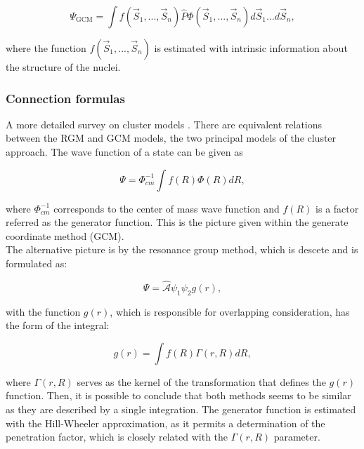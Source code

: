 \documentclass[openany]{book}
\begin{document}
\begin{equation}\label{eq:micro_cluster_GCM_waveFunction}
	\Psi_{\mathrm{GCM}} = \int f(\vec S_1, ..., \vec S_n) \hat P \Phi(\vec S_1, ..., \vec S_n) d\vec S_1 ... d\vec S_n,
\end{equation}

where the function $ f(\vec S_1, ..., \vec S_n) $ is estimated with intrinsic information about the structure of the nuclei. \\

\subsubsection{Connection formulas} \label{ssub:connectionFormulas}

A more detailed survey on cluster models \cite{beck_2012}. There are equivalent relations between the RGM and GCM models, the two principal models of the cluster approach. The wave function of a state can be given as

\begin{equation}\label{eq:micro_cluster_equivalency_RGM}
	\Psi = \Phi^{-1}_{cm} \int f(R) \Phi(R) dR,
\end{equation}

where $\Phi^{-1}_{cm}$ corresponds to the center of mass wave function and $f(R)$ is a factor referred as the generator function. This is the picture given within the generate coordinate method (GCM). \\

The alternative picture is by the resonance group method, which is descete and is formulated as:

\begin{equation}\label{eq:micro_cluster_equivalency_GCM}
	\Psi = \hat{\mathcal{A}} \psi_1 \psi_2 g(r), 
\end{equation}

with the function $g(r)$, which is responsible for overlapping consideration, has the form of the integral: 

\begin{equation}\label{eq:micro_cluster_equivalency_GCM_g}
	g(r) = \int f(R) \Gamma(r, R) dR,
\end{equation}

where $\Gamma(r, R)$ serves as the kernel of the transformation that defines the $g(r)$ function. Then, it is possible to conclude that both methods seems to be similar as they are described by a single integration. The generator function is estimated with the Hill-Wheeler approximation, as it permits a determination of the penetration factor, which is closely related with the $\Gamma(r, R)$ parameter. \\
\end{document}
